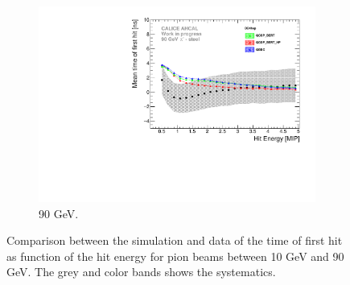 \begin{figure}[htbp!]
\begin{subfigure}[t]{0.49\textwidth}
    \includegraphics[width=1\textwidth]{../Thesis_Plots/Timing/Pions/Plots/ComparisonToSim/Time_Energy_90GeV_DD4hep.pdf}
    \caption{90 GeV.} \label{fig:Energy_SimData_90GeV_DD4hep}
  \end{subfigure}
  \caption{Comparison between the \ddhep simulation and data of the time of first hit as function of the hit energy for pion beams between 10 GeV and 90 GeV. The grey and color bands shows the systematics.}
\end{figure}


